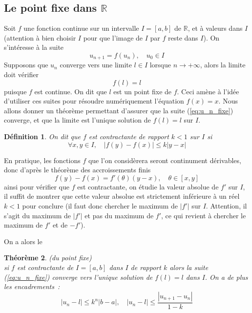 \documentclass[a4paper,11pt]{article}
\newtheorem{thm}{Théorème}
\newtheorem{defn}[thm]{D\'efinition}
\newcommand{\R}{{\mathbb{R}}}
\begin{document}
\subsection{Le point fixe dans $\R$} 
Soit $f$ une fonction continue sur un intervalle $I=[a,b]$ de $\R$, et 
à valeurs dans $I$ (attention à bien choisir $I$ pour que l'image
de $I$ par $f$ reste dans $I$).
On s'intéresse à la suite 
\begin{equation} \label{eq:u_n_fixe}
 u_{n+1}=f(u_n), \quad u_0 \in I 
\end{equation}
Supposons que $u_n$ converge vers une limite $l \in I$ lorsque
$n \rightarrow +\infty$, alors la limite doit vérifier
\[ f(l)=l \]
puisque $f$ est continue. On dit que $l$ est un point fixe de $f$.
Ceci amène à l'idée d'utiliser ces suites pour résoudre numériquement
l'équation $f(x)=x$. Nous allons donner un théorème permettant
d'assurer que la suite (\ref{eq:u_n_fixe}) converge, et que la limite
est l'unique solution de $f(l)=l$ sur $I$.

\begin{defn}
On dit que $f$ est contractante de rapport $k<1$ sur $I$ si
\[ \forall x,y \in I, \quad |f(y)-f(x)| \leq k |y-x| \]
\end{defn}

En pratique, les fonctions $f$ que l'on considèrera seront continument
dérivables, donc d'après le théorème des accroissements finis
\[ f(y)-f(x)=f'(\theta) (y-x), \quad \theta \in [x,y] \]
ainsi pour vérifier que $f$ est contractante, on étudie la valeur absolue
de $f'$ sur $I$, il suffit de montrer que cette valeur absolue
est strictement inférieure à un réel $k<1$ pour conclure (il faut
donc chercher le maximum de $|f'|$ sur $I$. Attention, il s'agit du
maximum de $|f'|$ et pas du maximum de $f'$, ce qui revient à chercher
le maximum de $f'$ et de $-f'$).

On a alors le 
\begin{thm} (du point fixe)\\
si $f$ est contractante de $I=[a,b]$
dans $I$ de rapport $k$ 
alors la suite (\ref{eq:u_n_fixe}) converge vers l'unique
solution de $f(l)=l$ dans $I$. On a de plus les encadrements~:
\begin{equation}  \label{eq:u_n_l}
|u_n-l| \leq k^n |b-a|, \quad
|u_n -l | \leq \frac{|u_{n+1}-u_n|}{1-k} 
\end{equation}
\end{thm}
\end{document}
